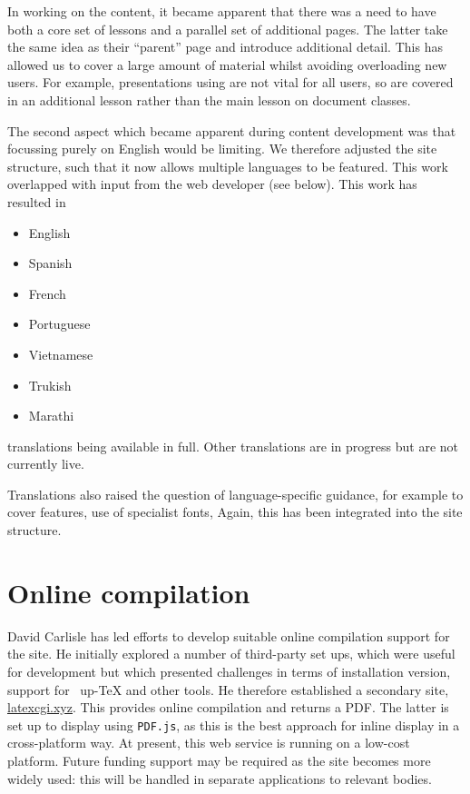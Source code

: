 \documentclass[a4paper]{article}
\begin{document}
In working on the content, it became apparent that there was a need to have
both a core set of lessons and a parallel set of additional pages. The latter
take the same idea as their \enquote{parent} page and introduce additional
detail. This has allowed us to cover a large amount of material whilst avoiding
overloading new users. For example, presentations using  are not
vital for all users, so are covered in an additional lesson rather than
the main lesson on document classes.

The second aspect which became apparent during content development was that
focussing purely on English would be limiting. We therefore adjusted the site
structure, such that it now allows multiple languages to be featured. This work
overlapped with input from the web developer (see below). This work has
resulted in
\begin{itemize}
  \item English
  \item Spanish
  \item French
  \item Portuguese
  \item Vietnamese
  \item Trukish
  \item Marathi
\end{itemize}
translations being available in full. Other translations are in progress but
are not currently live.

Translations also raised the question of language-specific guidance, for
example to cover  features, use of specialist fonts, 
Again, this has been integrated into the site structure.

\section{Online compilation}

David Carlisle has led efforts to develop suitable online compilation support
for the site. He initially explored a number of third-party set ups, which were
useful for development but which presented challenges in terms of installation
version, support for ~up-\TeX{} and other tools. He therefore
established a secondary site, \url{latexcgi.xyz}. This provides online
compilation and returns a PDF. The latter is set up to display using
\texttt{PDF.js}, as this is the best approach for inline display in a
cross-platform way. At present, this web service is running on a low-cost
platform. Future funding support may be required as the site becomes more
widely used: this will be handled in separate applications to relevant bodies.
\end{document}
